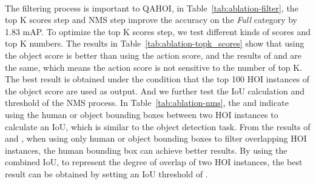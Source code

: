 \documentclass[10pt,twocolumn,letterpaper]{article}
\begin{document}
\\
\space The filtering process is important to QAHOI, in Table~\ref{tab:ablation-filter}, the top K scores step and NMS step improve the accuracy on the {\em Full} category by 1.83 mAP.
To optimize the top K scores step, we test different kinds of scores and top K numbers. 
The results in Table~\ref{tab:ablation-topk_scores} show that using the object score is better than using the action score, and the results of  and  are the same, which means the action score is not sensitive to the number of top K.
The best result is obtained under the condition that the top 100 HOI instances of the object score are used as output.
And we further test the IoU calculation and threshold of the NMS process. 
In Table~\ref{tab:ablation-nms}, the  and  indicate using the human or object bounding boxes between two HOI instances to calculate an IoU, which is similar to the object detection task. 
From the results of  and , when using only human or object bounding boxes to filter overlapping HOI instances, the human bounding box can achieve better results.
By using the combined IoU,  to represent the degree of overlap of two HOI instances, 
the best result can be obtained by setting an IoU threshold of .
\end{document}
